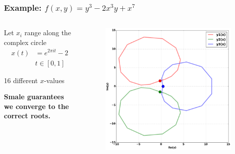 \documentclass{beamer}
\begin{document}
\begin{frame}
  \frametitle{Example: $f(x,y) = y^3 - 2x^3y + x^7$}
  \begin{columns}
    \begin{column}{0.3\textwidth}
      Let $x_i$ range along the complex circle
      \begin{align*}
          x(t) &= e^{2 \pi i t} - 2 \\
          & t \in [0,1]
      \end{align*}

      {
        \small 16 different $x$-values

        \vspace{16pt}

        {\bf Smale guarantees we converge to the correct roots.}
      }

    \end{column}

    \begin{column}{0.7\textwidth}
      \begin{figure}
        \centering
        \includegraphics[width=\textwidth]{images/ancontsmale.png}
      \end{figure}
    \end{column}
  \end{columns}
\end{frame}
\end{document}
